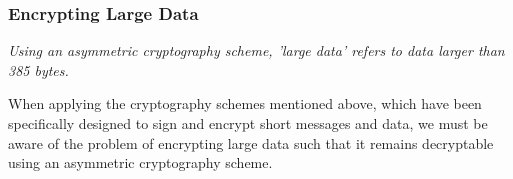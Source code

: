\subsubsection{Encrypting Large Data}

\textit{Using an asymmetric cryptography scheme, 'large data' refers to data larger than 385 bytes.}

When applying the cryptography schemes mentioned above, which have been specifically designed to sign and encrypt short messages and data, we must be aware of the problem of encrypting large data such that it remains decryptable using an asymmetric cryptography scheme. 

